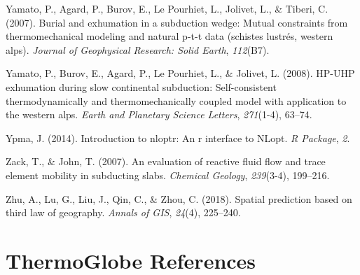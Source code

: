 \begin{CSLReferences}{1}{1}
\leavevmode{}%
Yamato, P., Agard, P., Burov, E., Le Pourhiet, L., Jolivet, L., \& Tiberi, C. (2007). Burial and exhumation in a subduction wedge: Mutual constraints from thermomechanical modeling and natural p-t-t data (schistes lustr{é}s, western alps). \emph{Journal of Geophysical Research: Solid Earth}, \emph{112}(B7).

\leavevmode{}%
Yamato, P., Burov, E., Agard, P., Le Pourhiet, L., \& Jolivet, L. (2008). HP-UHP exhumation during slow continental subduction: Self-consistent thermodynamically and thermomechanically coupled model with application to the western alps. \emph{Earth and Planetary Science Letters}, \emph{271}(1-4), 63--74.

\leavevmode{}%
Ypma, J. (2014). Introduction to nloptr: An r interface to NLopt. \emph{R Package}, \emph{2}.

\leavevmode{}%
Zack, T., \& John, T. (2007). An evaluation of reactive fluid flow and trace element mobility in subducting slabs. \emph{Chemical Geology}, \emph{239}(3-4), 199--216.

\leavevmode{}%
Zhu, A., Lu, G., Liu, J., Qin, C., \& Zhou, C. (2018). Spatial prediction based on third law of geography. \emph{Annals of GIS}, \emph{24}(4), 225--240.

\end{CSLReferences}

\cleardoublepage

\hypertarget{tglobe}{%
\chapter*{ThermoGlobe References}\label{tglobe}}


